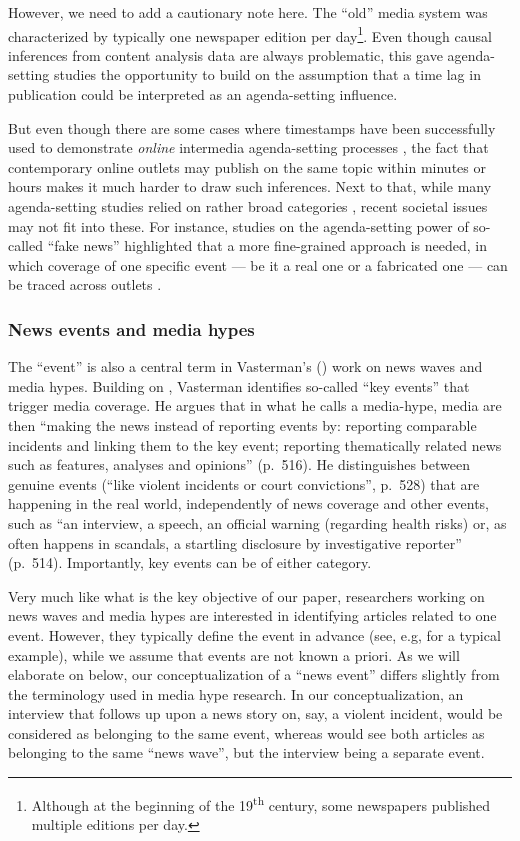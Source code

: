 \documentclass[a4paper,man,natbib,floatsintext,mask]{apa6}
\begin{document}
However, we need to add a cautionary note here. The ``old'' media system was characterized by typically one newspaper edition per day\footnote{Although at the beginning of the 19\textsuperscript{th} century, some newspapers published multiple editions per day.}. Even though causal inferences from content analysis data are always problematic, this gave agenda-setting studies the opportunity to build on the assumption that a time lag in publication could be interpreted as an agenda-setting influence.

But even though there are some cases where timestamps have been successfully used to demonstrate \textit{online} intermedia agenda-setting processes \citep{Haim2018a}, the fact that contemporary online outlets may publish on the same topic within minutes or hours makes it much harder to draw such inferences.
Next to that, while many agenda-setting studies relied on rather broad categories  \citep[see, e.g.][]{Baumgartner2006}, recent societal issues may not fit into these.
For instance, studies on the agenda-setting power of so-called ``fake news'' highlighted that a more fine-grained approach is needed, in which coverage of one specific event --- be it a real one or a fabricated one --- can be traced across outlets \citep{VanHoof2019,Vargo2018}.


\subsubsection{News events and media hypes}
The ``event'' is also a central term in Vasterman's (\citeyear{Vasterman2005}) work on news waves and media hypes. Building on \cite{Kepplinger1995}, Vasterman identifies so-called ``key events'' that trigger media coverage. He argues that in what he calls a media-hype, media are then ``making the news instead of reporting events by: reporting comparable incidents and linking them to the key event; reporting thematically related news such as features, analyses and opinions'' (p.~516).
He distinguishes between genuine events (``like violent incidents or court convictions'', p.~528) that are happening in the real world, independently of news coverage and other events, such as ``an interview, a speech, an official warning (regarding health risks) or, as often happens in scandals, a startling disclosure by investigative reporter'' (p.~514). Importantly, key events can be of either category.

Very much like what is the key objective of our paper, researchers working on news waves and media hypes are interested in identifying articles related to one event. However, they typically define the event in advance (see, e.g, \cite{Hellsten2015} for a typical example), while we assume that events are not known a priori.
As we will elaborate on below, our conceptualization of a ``news event'' differs slightly from the terminology used in media hype research. In our conceptualization, an interview that follows up upon a news story on, say, a violent incident, would be considered as belonging to the same event, whereas \cite{Vasterman2005} would see both articles as belonging to the same ``news wave'', but the interview being a separate event.
\end{document}
